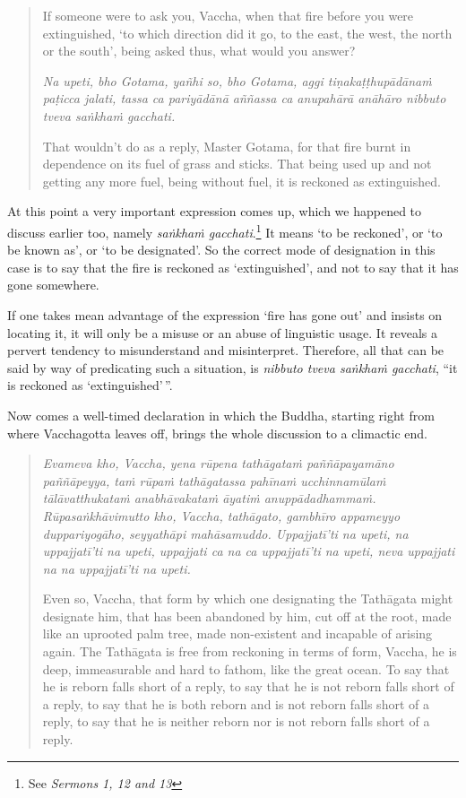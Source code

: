 \begin{quote}
If someone were to ask you, Vaccha, when that fire before you were extinguished, `to which direction did it go, to the east, the west, the north or the south', being asked thus, what would you answer?

\emph{Na upeti, bho Gotama, yañhi so, bho Gotama, aggi tiṇakaṭṭhupādānaṁ paṭicca jalati, tassa ca pariyādānā aññassa ca anupahārā anāhāro nibbuto tveva saṅkhaṁ gacchati.}

That wouldn't do as a reply, Master Gotama, for that fire burnt in dependence on its fuel of grass and sticks. That being used up and not getting any more fuel, being without fuel, it is reckoned as extinguished.
\end{quote}

At this point a very important expression comes up, which we happened to discuss earlier too, namely \emph{saṅkhaṁ gacchati}.\footnote{See \emph{Sermons 1, 12 and 13}} It means `to be reckoned', or `to be known as', or `to be designated'. So the correct mode of designation in this case is to say that the fire is reckoned as `extinguished', and not to say that it has gone somewhere.

If one takes mean advantage of the expression `fire has gone out' and insists on locating it, it will only be a misuse or an abuse of linguistic usage. It reveals a pervert tendency to misunderstand and misinterpret. Therefore, all that can be said by way of predicating such a situation, is \emph{nibbuto tveva saṅkhaṁ gacchati}, ``it is reckoned as `extinguished'\,''.

Now comes a well-timed declaration in which the Buddha, starting right from where Vacchagotta leaves off, brings the whole discussion to a climactic end.

\begin{quote}
\emph{Evameva kho, Vaccha, yena rūpena tathāgataṁ paññāpayamāno paññāpeyya, taṁ rūpaṁ tathāgatassa pahīnaṁ ucchinnamūlaṁ tālāvatthukataṁ anabhāvakataṁ āyatiṁ anuppādadhammaṁ. Rūpasaṅkhāvimutto kho, Vaccha, tathāgato, gambhīro appameyyo duppariyogāho, seyyathāpi mahāsamuddo. Uppajjatī'ti na upeti, na uppajjatī'ti na upeti, uppajjati ca na ca uppajjatī'ti na upeti, neva uppajjati na na uppajjatī'ti na upeti.}

Even so, Vaccha, that form by which one designating the Tathāgata might designate him, that has been abandoned by him, cut off at the root, made like an uprooted palm tree, made non-existent and incapable of arising again. The Tathāgata is free from reckoning in terms of form, Vaccha, he is deep, immeasurable and hard to fathom, like the great ocean. To say that he is reborn falls short of a reply, to say that he is not reborn falls short of a reply, to say that he is both reborn and is not reborn falls short of a reply, to say that he is neither reborn nor is not reborn falls short of a reply.
\end{quote}

